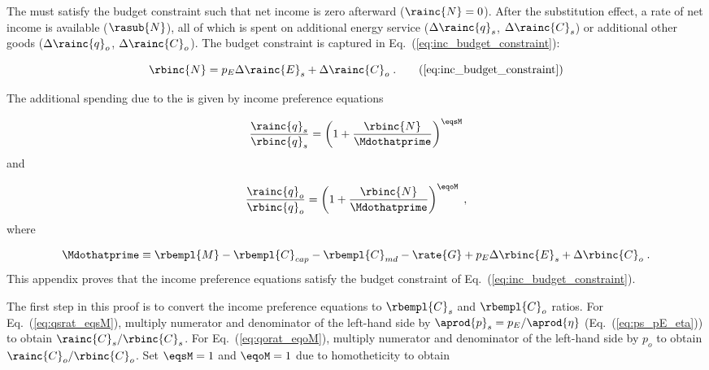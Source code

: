 

The \inceffect{} must satisfy the budget constraint
such that net income is zero afterward ($\rainc{N} = 0$).
After the substitution effect, 
a rate of net income is available ($\rasub{N}$), 
all of which is spent on
additional energy service ($\Delta \rainc{q}_s$, $\Delta \rainc{C}_s$) or 
additional other goods ($\Delta \rainc{q}_o$, $\Delta \rainc{C}_o$).
The budget constraint is captured in Eq.~(\ref{eq:inc_budget_constraint}): 

\begin{equation}
  \rbinc{N} = p_E \Delta \rainc{E}_s + \Delta \rainc{C}_o \; . \tag{\ref{eq:inc_budget_constraint}}
\end{equation}

The additional spending due to the \inceffect{} is given by income preference equations

\begin{equation} \label{eq:qsrat_eqsM}
  \frac{\rainc{q}_s}{\rbinc{q}_s} = \left( 1 + \frac{\rbinc{N}}{\Mdothatprime}  \right) ^{\eqsM}
\end{equation}
%
and

\begin{equation} \label{eq:qorat_eqoM}
  \frac{\rainc{q}_o}{\rbinc{q}_o} = \left( 1 + \frac{\rbinc{N}}{\Mdothatprime}  \right) ^{\eqoM} \; ,
\end{equation}
%
where

\begin{equation} \label{eq:effective_income}
  \Mdothatprime \equiv \rbempl{M} - \rbempl{C}_{cap} - \rbempl{C}_{md} 
                       - \rate{G} + p_E \Delta \rbinc{E}_s + \Delta \rbinc{C}_o \; .
\end{equation}
%
This appendix proves that the income preference equations
satisfy the budget constraint of Eq.~(\ref{eq:inc_budget_constraint}).

The first step in this proof is to convert 
the income preference equations
to $\rbempl{C}_s$ and $\rbempl{C}_o$ ratios.
For Eq.~(\ref{eq:qsrat_eqsM}), 
multiply numerator and denominator of the left-hand side by $\aprod{p}_s = p_E / \aprod{\eta}$
(Eq.~(\ref{eq:ps_pE_eta}))
to obtain $\rainc{C}_s / \rbinc{C}_s$.
For Eq.~(\ref{eq:qorat_eqoM}), 
multiply numerator and denominator of the left-hand side by $p_o$
to obtain $\rainc{C}_o / \rbinc{C}_o$.
Set $\eqsM = 1$ and $\eqoM = 1$ due to homotheticity to obtain

